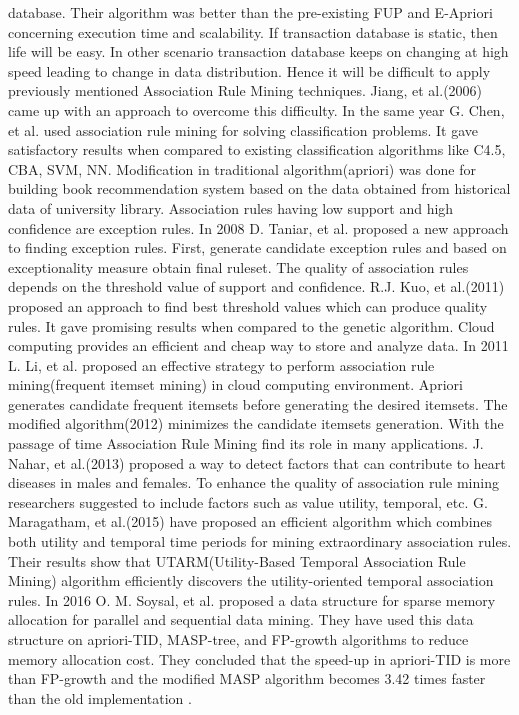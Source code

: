 \documentclass[review]{elsarticle}
\begin{document}
database. Their algorithm was better than the pre-existing FUP and E-Apriori concerning execution time and scalability. If transaction database is static, then life will be easy. In other scenario transaction database keeps on changing at high speed leading to change in data distribution. Hence it will be difficult to apply previously mentioned Association Rule Mining techniques. Jiang, et al.(2006) \cite{dynamicarm} came up with an approach to overcome this difficulty. In the same year G. Chen, et al. \cite{classify} used association rule mining for solving classification problems. It gave satisfactory results when compared to existing classification algorithms like C4.5, CBA, SVM, NN. Modification in traditional algorithm(apriori) was done \cite{bookrecommend} for building book recommendation system based on the data obtained from historical data of university library. Association rules having low support and high confidence are exception rules. In 2008 D. Taniar, et al. \cite{exceptionrules} proposed a new approach to finding exception rules. First, generate candidate exception rules and based on exceptionality measure obtain final ruleset. The quality of association rules depends on the threshold value of support and confidence. R.J. Kuo, et al.(2011) \cite{swarmarm} proposed an approach to find best threshold values which can produce quality rules. It gave promising results when compared to the genetic algorithm. Cloud computing provides an efficient and cheap way to store and analyze data. In 2011 L. Li, et al. \cite{cloudarm} proposed an effective strategy to perform association rule mining(frequent itemset mining) in cloud computing environment. Apriori \cite{fastapriori} generates candidate frequent itemsets before generating the desired itemsets. The modified algorithm(2012) \cite{minmizcandidt} minimizes the candidate itemsets generation. With the passage of time Association Rule Mining find its role in many applications. J. Nahar, et al.(2013) \cite{armheart} proposed a way to detect factors that can contribute to heart diseases in males and females. To enhance the quality of association rule mining researchers suggested to include factors such as value utility, temporal, etc. G. Maragatham, et al.(2015) \cite{utarm} have proposed an efficient algorithm which combines both utility and temporal time periods for mining extraordinary association rules. Their results show that UTARM(Utility-Based Temporal Association Rule Mining) algorithm efficiently discovers the utility-oriented temporal association rules. In 2016 O. M. Soysal, et al. \cite{sparseds} proposed a data structure for sparse memory allocation for parallel and sequential data mining. They have used this data structure on apriori-TID, MASP-tree, and FP-growth algorithms to reduce memory allocation cost. They concluded that the speed-up in apriori-TID is more than FP-growth and the modified MASP algorithm becomes 3.42 times faster than the old implementation \cite{oldmasp}.
\end{document}
